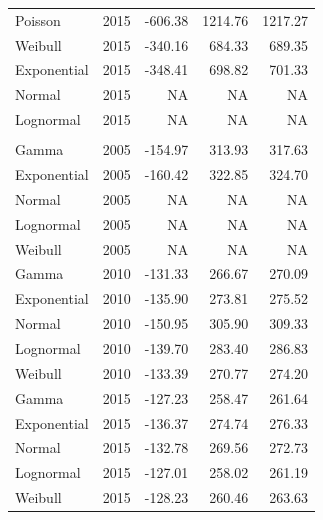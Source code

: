 \documentclass[
11pt, %
oneside, %
english, %
singlespacing, %
]{macthesis} %
\begin{document}
\begin{table}
\begin{tabular}{llrrr}
\hspace{1em}Poisson & 2015 & -606.38 & 1214.76 & 1217.27\\
\hspace{1em}Weibull & 2015 & -340.16 & 684.33 & 689.35\\
\hspace{1em}Exponential & 2015 & -348.41 & 698.82 & 701.33\\
\hspace{1em}Normal & 2015 & NA & NA & NA\\
\hspace{1em}Lognormal & 2015 & NA & NA & NA\\
\addlinespace[0.3em]
\multicolumn{5}{l}{\textbf{Destination: Place of worship}}\\
\hspace{1em}Gamma & 2005 & -154.97 & 313.93 & 317.63\\
\hspace{1em}Exponential & 2005 & -160.42 & 322.85 & 324.70\\
\hspace{1em}Normal & 2005 & NA & NA & NA\\
\hspace{1em}Lognormal & 2005 & NA & NA & NA\\
\hspace{1em}Weibull & 2005 & NA & NA & NA\\
\hspace{1em}Gamma & 2010 & -131.33 & 266.67 & 270.09\\
\hspace{1em}Exponential & 2010 & -135.90 & 273.81 & 275.52\\
\hspace{1em}Normal & 2010 & -150.95 & 305.90 & 309.33\\
\hspace{1em}Lognormal & 2010 & -139.70 & 283.40 & 286.83\\
\hspace{1em}Weibull & 2010 & -133.39 & 270.77 & 274.20\\
\hspace{1em}Gamma & 2015 & -127.23 & 258.47 & 261.64\\
\hspace{1em}Exponential & 2015 & -136.37 & 274.74 & 276.33\\
\hspace{1em}Normal & 2015 & -132.78 & 269.56 & 272.73\\
\hspace{1em}Lognormal & 2015 & -127.01 & 258.02 & 261.19\\
\hspace{1em}Weibull & 2015 & -128.23 & 260.46 & 263.63\\
\bottomrule
\end{tabular}
\endgroup{}
\end{table}
\end{document}
